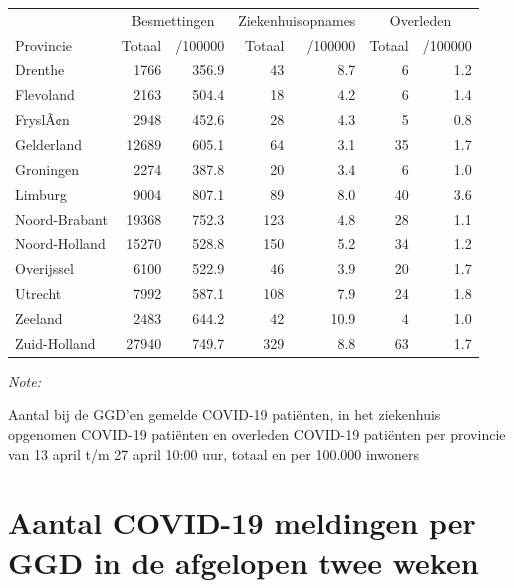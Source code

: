 \documentclass[
  english,
  man,floatsintext]{apa6}
\begin{document}
\begin{table}
\centering
\begin{threeparttable}
\begin{tabular}{lrrrrrr}
\toprule
\multicolumn{1}{c}{ } & \multicolumn{2}{c}{Besmettingen} & \multicolumn{2}{c}{Ziekenhuisopnames} & \multicolumn{2}{c}{Overleden} \\
\cmidrule(l{3pt}r{3pt}){2-3} \cmidrule(l{3pt}r{3pt}){4-5} \cmidrule(l{3pt}r{3pt}){6-7}
Provincie & Totaal & /100000 & Totaal & /100000 & Totaal & /100000\\
\midrule
Drenthe & 1766 & 356.9 & 43 & 8.7 & 6 & 1.2\\
Flevoland & 2163 & 504.4 & 18 & 4.2 & 6 & 1.4\\
FryslÃ¢n & 2948 & 452.6 & 28 & 4.3 & 5 & 0.8\\
Gelderland & 12689 & 605.1 & 64 & 3.1 & 35 & 1.7\\
Groningen & 2274 & 387.8 & 20 & 3.4 & 6 & 1.0\\
Limburg & 9004 & 807.1 & 89 & 8.0 & 40 & 3.6\\
Noord-Brabant & 19368 & 752.3 & 123 & 4.8 & 28 & 1.1\\
Noord-Holland & 15270 & 528.8 & 150 & 5.2 & 34 & 1.2\\
Overijssel & 6100 & 522.9 & 46 & 3.9 & 20 & 1.7\\
Utrecht & 7992 & 587.1 & 108 & 7.9 & 24 & 1.8\\
Zeeland & 2483 & 644.2 & 42 & 10.9 & 4 & 1.0\\
Zuid-Holland & 27940 & 749.7 & 329 & 8.8 & 63 & 1.7\\
\bottomrule
\end{tabular}
\begin{tablenotes}
\item \textit{Note: } 
\item Aantal bij de GGD’en gemelde COVID-19 patiënten, in het ziekenhuis opgenomen COVID-19 patiënten en overleden COVID-19 patiënten per provincie van 13 april t/m 27 april 10:00 uur, totaal en per 100.000 inwoners
\end{tablenotes}
\end{threeparttable}
\end{table}

\newpage

\hypertarget{aantal-covid-19-meldingen-per-ggd-in-de-afgelopen-twee-weken}{%
\section{Aantal COVID-19 meldingen per GGD in de afgelopen twee weken}\label{aantal-covid-19-meldingen-per-ggd-in-de-afgelopen-twee-weken}}
\end{document}
